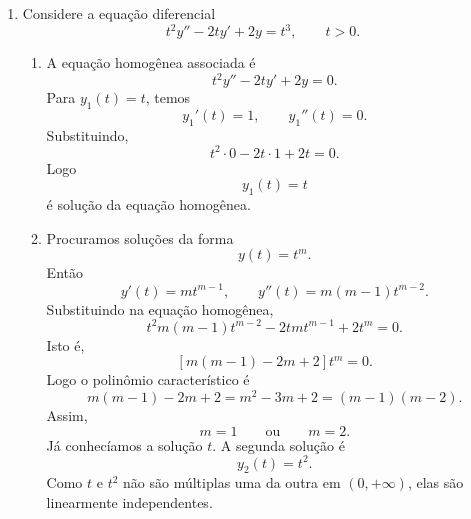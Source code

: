 \documentclass[a4paper,11pt,reqno]{amsart}
\begin{document}
\begin{enumerate}
\begin{enumerate}
\item No ponto $(t_0,y_0)=(0,0)$, temos
\[
    y'=3y^{2/3},
    \qquad
    y(0)=0.
\]
A solução identicamente nula,
\[
    \boxed{y(t)\equiv 0,}
\]
é uma solução.

Por outro lado,
\[
    \boxed{y(t)=t^3}
\]
também é solução, pois
\[
    y'(t)=3t^2,
\]
enquanto
\[
    3y(t)^{2/3}=3(t^3)^{2/3}=3t^2.
\]
Além disso,
\[
    y(0)=0.
\]
Portanto o PVI não tem solução única.

Na verdade, há infinitas soluções. Para cada $a\geq 0$, a função
\[
    y_a(t)=
    \begin{cases}
        0, & t\leq a,\\
        (t-a)^3, & t\geq a,
    \end{cases}
\]
é solução e satisfaz $y_a(0)=0$.

\item A diferença entre os dois casos está na hipótese de unicidade do teorema de existência e unicidade.

A função
\[
    f(t,y)=3y^{2/3}
\]
é contínua em todo lugar, portanto o teorema de existência garante existência local para qualquer condição inicial.

No entanto, a derivada parcial em relação a $y$ é
\[
    \frac{\partial f}{\partial y}(t,y)=2y^{-1/3},
\]
que não é contínua em $y=0$.

No ponto $(0,1)$, estamos longe de $y=0$, então $f$ é localmente Lipschitz em $y$ e a solução local é única.

No ponto $(0,0)$, a hipótese de unicidade falha. Isso não prova automaticamente que a solução não é única, mas abre a possibilidade de não unicidade. De fato, como vimos no item anterior, há várias soluções passando por $(0,0)$.

\end{enumerate}


\item Considere a equação diferencial
\[
    t^2y''-2ty'+2y=t^3,
    \qquad
    t>0.
\]

\begin{enumerate}

\item A equação homogênea associada é
\[
    t^2y''-2ty'+2y=0.
\]
Para $y_1(t)=t$, temos
\[
    y_1'(t)=1,
    \qquad
    y_1''(t)=0.
\]
Substituindo,
\[
    t^2\cdot 0-2t\cdot 1+2t=0.
\]
Logo
\[
    \boxed{y_1(t)=t}
\]
é solução da equação homogênea.

\item Procuramos soluções da forma
\[
    y(t)=t^m.
\]
Então
\[
    y'(t)=mt^{m-1},
    \qquad
    y''(t)=m(m-1)t^{m-2}.
\]
Substituindo na equação homogênea,
\[
    t^2m(m-1)t^{m-2}
    -
    2tmt^{m-1}
    +
    2t^m
    =
    0.
\]
Isto é,
\[
    \left[m(m-1)-2m+2\right]t^m=0.
\]
Logo o polinômio característico é
\[
    m(m-1)-2m+2=m^2-3m+2=(m-1)(m-2).
\]
Assim,
\[
    m=1
    \qquad\text{ou}\qquad
    m=2.
\]
Já conhecíamos a solução $t$. A segunda solução é
\[
    \boxed{y_2(t)=t^2.}
\]
Como $t$ e $t^2$ não são múltiplas uma da outra em $(0,+\infty)$, elas são linearmente independentes.


\end{enumerate}
\end{enumerate}
\end{document}
